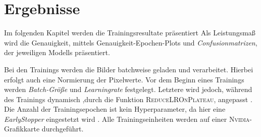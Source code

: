 \section{Ergebnisse}
Im folgenden Kapitel werden die Trainingsresultate präsentiert
Als Leistungsmaß wird die Genauigkeit, mittels Genauigkeit-Epochen-Plots
und \emph{Confusionmatrizen}, der jeweiligen Modells präsentiert.

Bei den Trainings werden die Bilder batchweise geladen und verarbeitet.
Hierbei erfolgt auch eine Normierung der Pixelwerte.
Vor dem Beginn eines Trainings werden \emph{Batch-Größe} und
\emph{Learningrate} festgelegt. Letztere wird jedoch, während des Trainings dynamisch
,durch die Funktion \textsc{ReduceLROnPlateau}, angepasst \cite{keras_ReduceLROnPlateau}.
 Die Anzahl der Trainingsepochen ist kein Hyperparameter, da hier eine \emph{EarlyStopper}
eingestetzt wird \cite{keras_EarlyStopping}.
Alle Trainingseinheiten werden auf einer \textsc{Nvidia}-Grafikkarte
durchgeführt.

